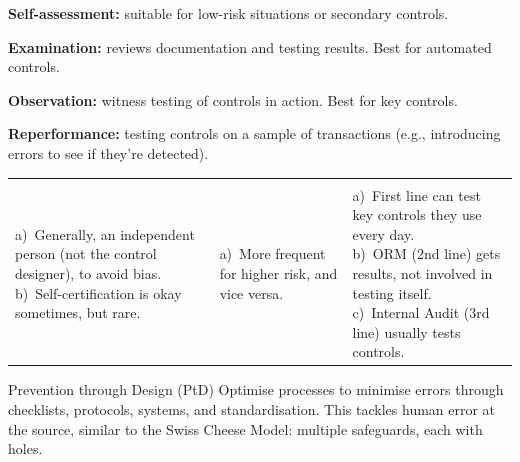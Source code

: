 
\begin{lettered}
\item \textbf{Self-assessment:} suitable for low-risk situations or secondary
controls.
\item \textbf{Examination:} reviews documentation and testing results. Best for
automated controls.
\item \textbf{Observation:} witness testing of controls in action. Best for key
controls.
\item \textbf{Reperformance:} testing controls on a sample of transactions (e.g.,
introducing errors to see if they're detected).
\end{lettered}

\noindent\begin{minipage}{\textwidth}
\renewcommand{\arraystretch}{1.32}
\begin{tabularx}{\textwidth}{@{}YYY@{}}
  &  & \\
{\tabfont
a)~Generally, an independent person (not the control designer), to avoid
bias.\newline
b)~Self-certification is okay sometimes, but rare.} &
{\tabfont
a)~More frequent for higher risk, and vice versa.} &
{\tabfont
a)~First line can test key controls they use every day.\newline
b)~ORM (2nd line) gets results, not involved in testing itself.\newline
c)~Internal Audit (3rd line) usually tests controls.}\\
\end{tabularx}
\end{minipage}



\begin{ordefbox}{Prevention through Design (PtD)}
Optimise processes to minimise errors through checklists, protocols, systems, and
standardisation. This tackles human error at the source, similar to the Swiss
Cheese Model: multiple safeguards, each with holes.
\end{ordefbox}

